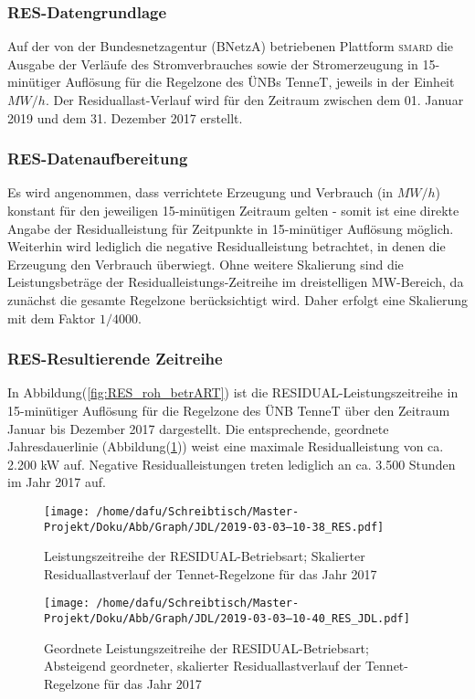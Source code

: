 \documentclass[onecolumn,10pt,titlepage]{article}
\begin{document}
\subsubsection{RES-Datengrundlage}
Auf der von der Bundesnetzagentur (BNetzA) betriebenen Plattform \textsc{smard}
die Ausgabe der Verläufe des Stromverbrauches sowie der Stromerzeugung in 15-minütiger Auflösung für die Regelzone des ÜNBs TenneT, jeweils in der Einheit $MW/h$. Der Residuallast-Verlauf wird für den Zeitraum zwischen dem 01. Januar 2019 und dem 31. Dezember 2017 erstellt.
\subsubsection{RES-Datenaufbereitung}
Es wird angenommen, dass verrichtete Erzeugung und Verbrauch (in $MW/h$) konstant für den jeweiligen 15-minütigen Zeitraum gelten - somit ist eine direkte Angabe der Residualleistung für Zeitpunkte in 15-minütiger Auflösung möglich. Weiterhin wird lediglich die negative Residualleistung betrachtet, in denen die Erzeugung den Verbrauch überwiegt.
Ohne weitere Skalierung sind die Leistungsbeträge der Residualleistungs-Zeitreihe im dreistelligen MW-Bereich, da zunächst die gesamte Regelzone berücksichtigt wird. Daher erfolgt eine Skalierung mit dem Faktor $1/4000$.
\subsubsection{RES-Resultierende Zeitreihe}

In Abbildung(\ref{fig:RES_roh_betrART}) ist die RESIDUAL-Leistungszeitreihe in 15-minütiger Auflösung für die Regelzone des ÜNB TenneT über den Zeitraum Januar bis Dezember 2017 dargestellt. Die entsprechende, geordnete Jahresdauerlinie (Abbildung(\ref{fig:RES_JDL_betrART})) weist eine maximale Residualleistung von  ca. 2.200 kW auf. Negative Residualleistungen treten lediglich an ca. 3.500 Stunden im Jahr 2017 auf.\\
\begin{figure}[H]
	\centering
	\begin{minipage}[t]{0.49\textwidth}
		\texttt{[image: /home/dafu/Schreibtisch/Master-Projekt/Doku/Abb/Graph/JDL/2019-03-03--10-38\_RES.pdf]}
		
		\caption[Leistungszeitreihe der RESIDUAL-Betriebsart]{Leistungszeitreihe der RESIDUAL-Betriebsart; Skalierter Residuallastverlauf der Tennet-Regelzone für das Jahr 2017}
		\label{fig:RES_roh_betrART} 
	\end{minipage}
	\hfill
	\begin{minipage}[t]{0.49\textwidth}
		\texttt{[image: /home/dafu/Schreibtisch/Master-Projekt/Doku/Abb/Graph/JDL/2019-03-03--10-40\_RES\_JDL.pdf]}
		\caption[Geortnete Leistungszeitreihe der RESIDUAL-Betriebsart]{Geordnete Leistungszeitreihe der RESIDUAL-Betriebsart; Absteigend geordneter, skalierter Residuallastverlauf der Tennet-Regelzone für das Jahr 2017}
		\label{fig:RES_JDL_betrART} 
	\end{minipage}
\end{figure}
\end{document}

